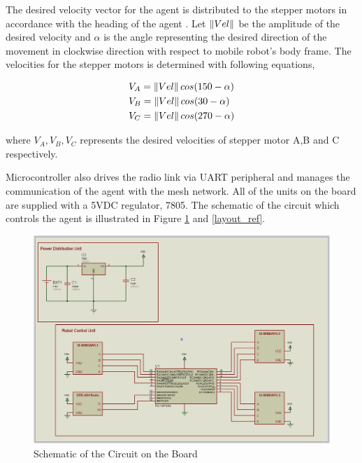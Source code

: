The desired velocity vector for the agent is  distributed to the stepper motors in accordance with the heading of the agent . Let $\left\lVert Vel\right\rVert$ be the amplitude of the desired velocity and $\alpha$ is the angle representing the desired direction of the movement in clockwise direction with respect to mobile robot's body frame.  The velocities for the stepper motors is determined with following equations,
		
\begin{align*}
& V_A = \left\lVert Vel\right\rVert cos(150-\alpha) \\
& V_B = \left\lVert Vel\right\rVert cos(30 -\alpha) \\
& V_C = \left\lVert Vel\right\rVert cos(270-\alpha) 
\end{align*}  

where $V_A, V_B, V_C$ represents the desired velocities of  stepper motor A,B and C respectively.
		
Microcontroller also drives the radio link via UART peripheral and manages the communication of the agent with the mesh network. All of the units on the board are supplied with a 5VDC regulator, 7805. The schematic of the circuit which controls the agent is illustrated in Figure \ref{sematik_ref} and \ref{layout_ref}.
		
\begin{figure}[H]
\caption{Schematic of the Circuit on the Board} \label{sematik_ref}
\centerline{\includegraphics[scale = 0.40]{sematik}}
\end{figure} 

